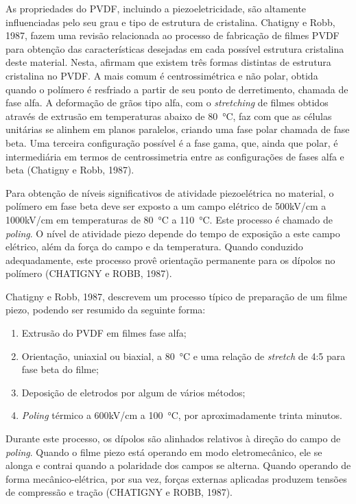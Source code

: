 \documentclass[
	12pt,				
	oneside,			
	a4paper,			
	english,			
	brazil,			
	]{abntex2ppgsi}
\begin{document}
As propriedades do PVDF, incluindo a piezoeletricidade, são altamente influenciadas pelo seu grau e tipo de estrutura de cristalina. Chatigny e Robb, 1987, fazem uma revisão relacionada ao processo de fabricação de filmes PVDF para obtenção das características desejadas em cada possível estrutura cristalina deste material. Nesta, afirmam que existem três formas distintas de estrutura cristalina no PVDF. A mais comum é centrossimétrica e não polar, obtida quando o polímero é resfriado a partir de seu ponto de derretimento, chamada de fase alfa. A deformação de grãos tipo alfa, com o \textit{stretching} de filmes obtidos através de extrusão em temperaturas abaixo de \SI{80}{\celsius}, faz com que as células unitárias se alinhem em planos paralelos, criando uma fase polar chamada de fase beta. Uma terceira configuração possível é a fase gama, que, ainda que polar, é intermediária em termos de centrossimetria entre as configurações de fases alfa e beta (Chatigny e Robb, 1987).

Para obtenção de níveis significativos de atividade piezoelétrica no material, o polímero em fase beta deve ser exposto a um campo elétrico de 500kV/cm a 1000kV/cm em temperaturas de \SI{80}{\celsius} a \SI{110}{\celsius}. Este processo é chamado de \textit{poling}. O nível de atividade piezo depende do tempo de exposição a este campo elétrico, além da força do campo e da temperatura. Quando conduzido adequadamente, este processo provê orientação permanente para os dípolos no polímero (CHATIGNY e ROBB, 1987). 

Chatigny e Robb, 1987, descrevem um processo típico de preparação de um filme piezo, podendo ser resumido da seguinte forma:

\begin{enumerate}
	\item Extrusão do PVDF em filmes fase alfa; 
	\item Orientação, uniaxial ou biaxial, a \SI{80}{\celsius} e uma relação de \textit{stretch} de 4:5 para fase beta do filme;
	\item Deposição de eletrodos por algum de vários métodos;
	\item \textit{Poling} térmico a 600kV/cm a \SI{100}{\celsius}, por aproximadamente trinta minutos.
\end{enumerate}

Durante este processo, os dípolos são alinhados relativos à direção do campo de \textit{poling}. Quando o filme piezo está operando em modo eletromecânico, ele se alonga e contrai quando a polaridade dos campos se alterna. Quando operando de forma mecânico-elétrica, por sua vez, forças externas aplicadas produzem tensões de compressão e tração (CHATIGNY e ROBB, 1987). 
\end{document}
